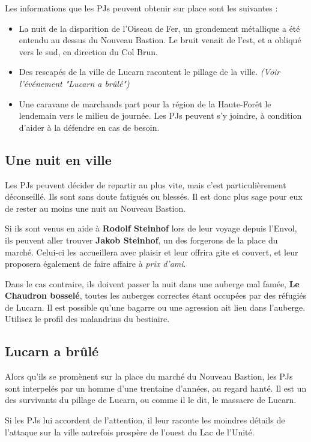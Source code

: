 \documentclass[10pt,twoside,twocolumn,openany,bg=print,justified]{dndbook}
\begin{document}
Les informations que les PJs peuvent obtenir sur place sont les suivantes :

\begin{itemize}
	\item La nuit de la disparition de l'Oiseau de Fer, un grondement métallique a été entendu au dessus du Nouveau Bastion. Le bruit venait de l'est, et a obliqué vers le sud, en direction du Col Brun.
	\item Des rescapés de la ville de Lucarn racontent le pillage de la ville. \textit{(Voir l'événement "Lucarn a brûlé")}
	\item Une caravane de marchands part pour la région de la Haute-Forêt le lendemain vers le milieu de journée. Les PJs peuvent s'y joindre, à condition d'aider à la défendre en cas de besoin.
\end{itemize}

\subsection*{Une nuit en ville}

Les PJs peuvent décider de repartir au plus vite, mais c'est particulièrement déconseillé. Ils sont sans doute fatigués ou blessés. Il est donc plus sage pour eux de rester au moins une nuit au Nouveau Bastion.

Si ils sont venus en aide à \textbf{Rodolf Steinhof} lors de leur voyage depuis l'Envol, ils peuvent aller trouver \textbf{Jakob Steinhof}, un des forgerons de la place du marché. Celui-ci les accueillera avec plaisir et leur offrira gite et couvert, et leur proposera également de faire affaire à \textit{prix d'ami}.

Dans le cas contraire, ils doivent passer la nuit dans une auberge mal famée, \textbf{Le Chaudron bosselé}, toutes les auberges correctes étant occupées par des réfugiés de Lucarn. Il est possible qu'une bagarre ou une agression ait lieu dans l'auberge. Utilisez le profil des malandrins du bestiaire.

\subsection*{Lucarn a brûlé}

Alors qu'ils se promènent sur la place du marché du Nouveau Bastion, les PJs sont interpelés par un homme d'une trentaine d'années, au regard hanté. Il est un des survivants du pillage de Lucarn, ou comme il le dit, le massacre de Lucarn.

Si les PJs lui accordent de l'attention, il leur raconte les moindres détails de l'attaque sur la ville autrefois prospère de l'ouest du Lac de l'Unité.
\end{document}
